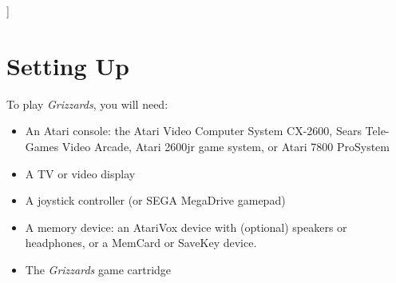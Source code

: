 \documentclass[10pt,twocolumn,openany,article]{memoir}
\begin{document}
]

\let\cleardoublepage\clearpage

\mainmatter

\tableofcontents

\chapter{Setting Up}\label{Setting Up}

To play \textit{Grizzards}, you will need:

\begin{itemize}
\item An Atari  console: the Atari Video Computer  System CX-2600, Sears
  Tele-Games  Video Arcade,  Atari  2600jr game  system,  or Atari  7800
  ProSystem
\item A TV or video display
\item        A        joystick         controller        (or        SEGA
  \ifdefined{}\fi{}MegaDrive gamepad)
  \ifdefined\NOSAVE\else
\item A  memory device: an  AtariVox device with (optional)  speakers or
  headphones, or a MemCard or SaveKey device.
  \fi
\item The \textit{Grizzards} game cartridge
\end{itemize}
\end{document}
